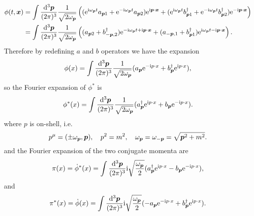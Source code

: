 \documentclass[hyperref, a4paper]{article}
\newcommand*{\ii}{\mathrm{i}}
\newcommand*{\ee}{\mathrm{e}}
\begin{document}
\begin{itemize}
\[\begin{aligned}
            \phi(t, \vb*{x}) &= \int \frac{\dd[3]{\vb*{p}}}{(2\pi)^3} \frac{1}{\sqrt{2 \omega_{\vb*{p}}}} \left(  (\ee^{\ii \omega_{\vb*{p}} t} a_{\vb*{p} 1} + \ee^{- \ii \omega_{\vb*{p}} t} a_{\vb*{p} 2}) \ee^{\ii \vb*{p} \cdot \vb*{x}} + (\ee^{\ii \omega_{\vb*{p}} t} b^\dagger_{\vb*{p} 1} + \ee^{- \ii \omega_{\vb*{p}} t} b^\dagger_{\vb*{p} 2}) \ee^{- \ii \vb*{p} \cdot \vb*{x}} \right) \\
            &= \int \frac{\dd[3]{\vb*{p}}}{(2\pi)^3} \frac{1}{\sqrt{2 \omega_{\vb*{p}}}} \left( (a_{\vb*{p}2} + b^\dagger_{- \vb*{p}, 2}) \ee^{-\ii \omega_{\vb*{p}} t + \ii \vb*{p} \cdot \vb*{x}} + (a_{-\vb*{p} ,1} + b^\dagger_{\vb*{p} 1}) \ee^{\ii \omega_{\vb*{p}} t - \ii \vb*{p} \cdot \vb*{x}} \right).
        \end{aligned}
    \]
    Therefore by redefining $a$ and $b$ operators we have the expansion
    \begin{equation}
        \phi(x) = \int \frac{\dd[3]{\vb*{p}}}{(2\pi)^3} \frac{1}{\sqrt{2 \omega_{\vb*{p}}}} (a_{\vb*{p}} \ee^{- \ii p \cdot x} + b^\dagger_{\vb*{p}} \ee^{\ii p \cdot x}),
        \label{eq:complex-scalar-expansion}
    \end{equation} 
    so the Fourier expansion of $\phi^*$ is
    \begin{equation}
        \phi^*(x) = \int \frac{\dd[3]{\vb*{p}}}{(2\pi)^3} \frac{1}{\sqrt{2\omega_{\vb*{p}}}} (a^\dagger_{\vb*{p}} \ee^{\ii p \cdot x} + b_{\vb*{p}} \ee^{- \ii p \cdot x}).
    \end{equation} 
    where $p$ is on-shell, i.e.
    \begin{equation}
        p^\mu = (\pm \omega_{\vb*{p}}, \vb*{p}), \quad p^2 = m^2, \quad \omega_{\vb*{p}} = \omega_{-\vb*{p}}= \sqrt{{\vb*{p}}^2 + m^2}.
    \end{equation}
    and the Fourier expansion of the two conjugate momenta are 
    \begin{equation}
        \pi(x) = \dot{\phi}^*(x) = \int \frac{\dd[3]{\vb*{p}}}{(2\pi)^3} \ii \sqrt{\frac{\omega_{\vb*{p}}}{2}} (a^\dagger_{\vb*{p}} \ee^{\ii p \cdot x} - b_{\vb*{p}} \ee^{- \ii p \cdot x}),
    \end{equation}
    and 
    \begin{equation}
        \pi^*(x) = \dot{\phi}(x) = \int \frac{\dd[3]{\vb*{p}}}{(2\pi)^3} \ii \sqrt{\frac{\omega_{\vb*{p}}}{2}} (- a_{\vb*{p}} \ee^{- \ii p \cdot x} + b^\dagger_{\vb*{p}} \ee^{\ii p \cdot x}).
    \end{equation}


\end{itemize}
\end{document}

